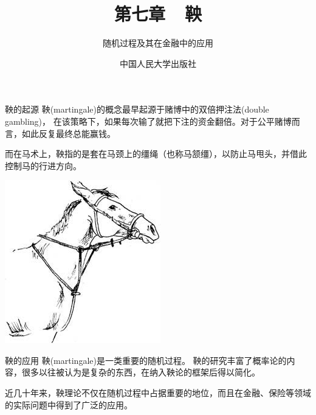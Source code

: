 \documentclass[t]{beamer}
\begin{document}
\fontsize{11}{18}\selectfont


\CTEXindent



  \title{第七章~~鞅}
\author{随机过程及其在金融中的应用}
\date{中国人民大学出版社}
  \begin{frame}
    \maketitle
  \end{frame}

  \begin{frame}{鞅的起源}
    鞅(martingale)的概念最早起源于赌博中的双倍押注法(double gambling)，
    在该策略下，如果每次输了就把下注的资金翻倍。对于公平赌博而言，如此反复最终总能赢钱。
    
    而在马术上，鞅指的是套在马颈上的缰绳（也称马颔缰），以防止马甩头，并借此控制马的行进方向。
    \begin{center}
    \includegraphics[scale=0.7]{fig/martingale.jpg}
    \end{center}
    
    \end{frame}
    
    
    \begin{frame}{鞅的应用}
    鞅(martingale)是一类重要的随机过程。
    鞅的研究丰富了概率论的内容，很多以往被认为是复杂的东西，在纳入鞅论的框架后得以简化。
    
    近几十年来，鞅理论不仅在随机过程中占据重要的地位，而且在金融、保险等领域的实际问题中得到了广泛的应用。
    \end{frame}
    
\end{document}
